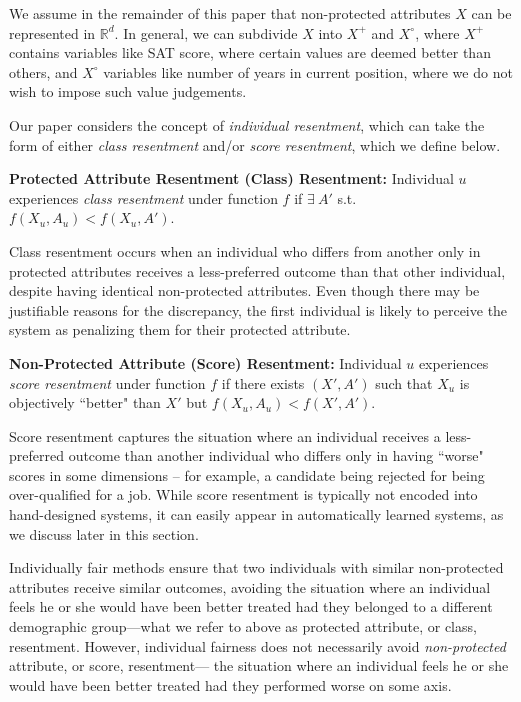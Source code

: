     We assume in the remainder of this paper that non-protected attributes $X$ can be represented in $\mathbb{R}^d$. In general, we can subdivide $X$ into $X^+$ and $X^\circ$, where $X^+$ contains variables like SAT score, where certain values are deemed better than others, and $X^\circ$ variables like number of years in current position, where we do not wish to impose such value judgements. 

    Our paper considers the concept of \textit{individual resentment}, which can take the form of either {\it class resentment} and/or {\it score resentment}, which we define below. 
    
    \begin{defn} \label{def:ClassResentment}
        {\bf Protected Attribute Resentment (Class) Resentment:} Individual $u$ experiences {\it class resentment} under function $f$ if $\exists~A'$ s.t. $f(X_u, A_u) < f(X_u, A')$.
    \end{defn}
    Class resentment occurs when an individual who differs from another only in protected attributes receives a less-preferred outcome than that other individual, despite having identical non-protected attributes.  Even though there may be justifiable reasons for the discrepancy, the first individual is likely to perceive the system as penalizing them for their protected attribute.

    \begin{defn} \label{def:ScoreResentment}
        {\bf Non-Protected Attribute (Score) Resentment:} Individual $u$ experiences {\it score resentment} under function $f$ if there exists $(X', A')$ such that $X_u$ is objectively ``better" than $X'$ but $f(X_u, A_u) < f(X', A')$.
    \end{defn}
    
    Score resentment captures the situation where an individual receives a less-preferred outcome than another individual who differs only in having ``worse" scores in some dimensions -- for example, a candidate being rejected for being over-qualified for a job. While score resentment is typically not encoded into hand-designed systems, it can easily appear in automatically learned systems, as we discuss later in this section.

    Individually fair methods ensure that two individuals with similar non-protected attributes receive similar outcomes, avoiding the situation where an individual feels he or she would have been better treated had they belonged to a different demographic group---what we refer to above as protected attribute, or class, resentment. However, individual fairness does not necessarily avoid \textit{non-protected} attribute, or score, resentment--- the situation where an individual feels he or she would have been better treated had they performed worse on some axis. 
    
